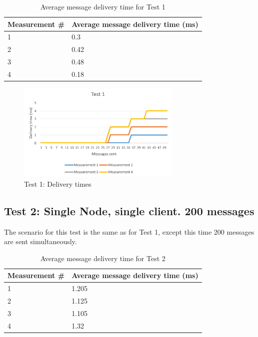\begin{table}[!ht]
\begin{center}
\begin{tabularx}{0.7\textwidth}{l|l}
\hline
\textbf{Measurement \#} & \textbf{Average message delivery time (ms)} \\
\hline
1 & 0.3\\
\hline
2 & 0.42\\
\hline
3 & 0.48\\
\hline
4 & 0.18\\
\hline
\end{tabularx}
\end{center}
\caption{Average message delivery time for Test 1}
\label{tab:test-perf1}
\end{table}

\begin{figure}[!ht]
	\centering
	\includegraphics[width=0.7\textwidth]{figures/05_testing/test-perf1}
    \caption{Test 1: Delivery times}
    \label{fig:test-perf1}
\end{figure}

\subsection{Test 2: Single Node, single client. 200 messages}
The scenario for this test is the same as for Test 1, except this time 200 messages are sent simultaneously.

\begin{table}[!ht]
\begin{center}
\begin{tabularx}{0.7\textwidth}{l|l}
\hline
\textbf{Measurement \#} & \textbf{Average message delivery time (ms)} \\
\hline
1 & 1.205\\
\hline
2 & 1.125\\
\hline
3 & 1.105\\
\hline
4 & 1.32\\
\hline
\end{tabularx}
\end{center}
\caption{Average message delivery time for Test 2}
\label{tab:test-perf2}
\end{table}

